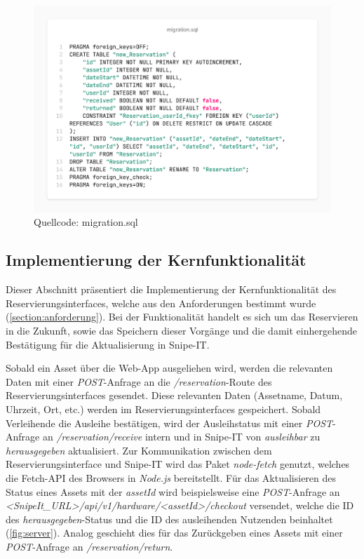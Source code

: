\begin{figure}[h]
  \centering
  \includegraphics[scale=0.35]{Bilder/screenshot(7).png}
  \caption[Quellcode: migration.sql]{Quellcode: migration.sql}
  \label{fig:mig}
\end{figure}


\subsection{Implementierung der Kernfunktionalität}
\label{subsec:kernfkt}
Dieser Abschnitt präsentiert die Implementierung der Kernfunktionalität des
Reservierungsinterfaces, welche aus den Anforderungen bestimmt wurde (\ref{section:anforderung}).
Bei der Funktionalität handelt es sich um das Reservieren in die Zukunft, sowie das Speichern
dieser Vorgänge und die damit einhergehende Bestätigung für die Aktualisierung in Snipe-IT.


Sobald ein Asset über die Web-App ausgeliehen wird, werden die relevanten Daten mit einer
\textit{POST}-Anfrage an die \textit{/reservation}-Route des Reservierungsinterfaces gesendet.
Diese relevanten Daten (Assetname, Datum, Uhrzeit, Ort, etc.) werden im Reservierungsinterfaces
gespeichert. Sobald Verleihende die Ausleihe bestätigen, wird der Ausleihstatus mit einer
\textit{POST}-Anfrage an \textit{/reservation/receive} intern und in Snipe-IT von
\textit{ausleihbar} zu \textit{herausgegeben} aktualisiert. Zur Kommunikation zwischen dem
Reservierungsinterface und Snipe-IT wird das Paket \textit{node-fetch} genutzt, welches die
Fetch-API des Browsers in \textit{Node.js} bereitstellt. Für das Aktualisieren des Status eines
Assets mit der \textit{assetId} wird beispielsweise eine \textit{POST}-Anfrage an
\textit{<SnipeIt\_URL>/api/v1/hardware/<assetId>/checkout} versendet, welche die ID des
\textit{herausgegeben}-Status und die ID des ausleihenden Nutzenden beinhaltet (\ref{fig:server}).
Analog geschieht dies für das Zurückgeben eines Assets mit einer \textit{POST}-Anfrage an
\textit{/reservation/return}.

